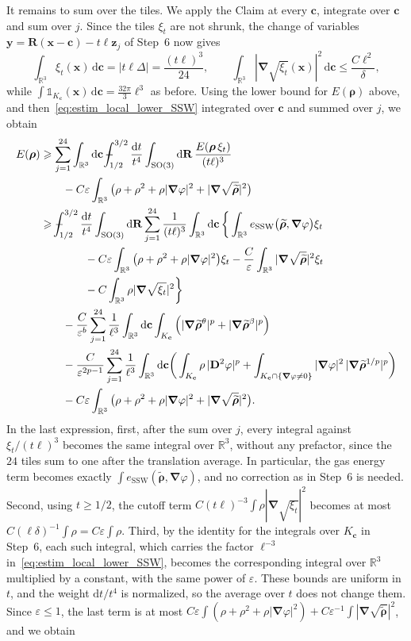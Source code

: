 \documentclass[final,reqno]{amsart}
\theoremstyle{remark}
\renewcommand{\le}{\leqslant}
\renewcommand{\ge}{\geqslant}
\renewcommand{\epsilon}{\varepsilon}
\newcommand{\wt}[1]{\widetilde{#1}}
\newcommand{\RR}{\mathbb{R}}
\newcommand{\SO}{\mathrm{SO}}
\newcommand{\SSW}{\mathrm{SSW}}
\newcommand{\iden}{\mathbb{1}}
\newcommand{\grad}{\bm{\nabla}}
\newcommand{\tetra}{\mathbb{\Delta}}
\newcommand{\dd}{\mathrm{d}}
\def\Xint#1{\mathchoice
{\XXint\displaystyle\textstyle{#1}}
{\XXint\textstyle\scriptstyle{#1}}
{\XXint\scriptstyle\scriptscriptstyle{#1}}
{\XXint\scriptscriptstyle\scriptscriptstyle{#1}}
\!\int}
\def\XXint#1#2#3{{\setbox0=\hbox{$#1{#2#3}{\int}$ }
\vcenter{\hbox{$#2#3$ }}\kern-.6\wd0}}
\def\dashint{\Xint-}
\begin{document}
It remains to sum over the tiles. We apply the Claim at every $\mathbf{c}$, integrate over $\mathbf{c}$ and sum over $j$. Since the tiles $\xi_t$ are not shrunk, the change of variables $\mathbf{y}=\mathbf{R}(\mathbf{x}-\mathbf{c})-t\ell\mathbf{z}_j$ of Step~6 now gives
$$
\int_{\RR^3}\xi_t(\mathbf{x})\,\dd\mathbf{c}=|t\ell\tetra|=\frac{(t\ell)^3}{24},\qquad
\int_{\RR^3}|\grad\sqrt{\xi_t}(\mathbf{x})|^2\,\dd\mathbf{c}\le\frac{C\ell^2}{\delta},
$$
while $\int\iden_{K_{\mathbf{c}}}(\mathbf{x})\,\dd\mathbf{c}=\frac{32\pi}{3}\ell^3$ as before. Using the lower bound for $E(\bm{\rho})$ above, and then~\cref{eq:estim_local_lower_SSW} integrated over $\mathbf{c}$ and summed over $j$, we obtain
\begin{align*}
E(\bm{\rho})&\ge\sum_{j=1}^{24}\int_{\RR^3}\dd\mathbf{c}\,\dashint_{1/2}^{3/2}\frac{\dd t}{t^4}\int_{\SO(3)}\dd\mathbf{R}\,\frac{E(\bm{\rho}\,\xi_t)}{(t\ell)^3}\\
&\qquad-C\epsilon\int_{\RR^3}\big(\rho+\rho^2+\rho|\grad\varphi|^2+|\grad\sqrt{\wt{\bm{\rho}}}|^2\big)\\
&\ge\dashint_{1/2}^{3/2}\frac{\dd t}{t^4}\int_{\SO(3)}\dd\mathbf{R}\sum_{j=1}^{24}\frac{1}{(t\ell)^3}\int_{\RR^3}\dd\mathbf{c}\,\bigg\{\int_{\RR^3}e_\SSW\big(\wt{\bm{\rho}},\grad\varphi\big)\xi_t\\
&\qquad\qquad-C\epsilon\int_{\RR^3}\big(\rho+\rho^2+\rho|\grad\varphi|^2\big)\xi_t-\frac C\epsilon\int_{\RR^3}|\grad\sqrt{\wt{\bm{\rho}}}|^2\xi_t\\
&\qquad\qquad-C\int_{\RR^3}\rho|\grad\sqrt{\xi_t}|^2\bigg\}\\
&\qquad-\frac{C}{\epsilon^b}\sum_{j=1}^{24}\frac{1}{\ell^3}\int_{\RR^3}\dd\mathbf{c}\int_{K_{\mathbf{c}}}\Big(|\grad\wt{\bm{\rho}}^\theta|^p+|\grad\wt{\bm{\rho}}^\beta|^p\Big)\\
&\qquad-\frac{C}{\epsilon^{2p-1}}\sum_{j=1}^{24}\frac{1}{\ell^3}\int_{\RR^3}\dd\mathbf{c}\bigg(\int_{K_{\mathbf{c}}}\rho\,|\mathbf{D}^2\varphi|^p+\int_{K_{\mathbf{c}}\cap\{\grad\varphi\ne0\}}|\grad\varphi|^2\,|\grad\wt{\bm{\rho}}^{1/p}|^p\bigg)\\
&\qquad-C\epsilon\int_{\RR^3}\big(\rho+\rho^2+\rho|\grad\varphi|^2+|\grad\sqrt{\wt{\bm{\rho}}}|^2\big).
\end{align*}
In the last expression, first, after the sum over $j$, every integral against $\xi_t/(t\ell)^3$ becomes the same integral over $\RR^3$, without any prefactor, since the $24$ tiles sum to one after the translation average. In particular, the gas energy term becomes exactly $\int e_\SSW(\wt{\bm{\rho}},\grad\varphi)$, and no correction as in Step~6 is needed. Second, using $t\ge1/2$, the cutoff term $C(t\ell)^{-3}\int\rho|\grad\sqrt{\xi_t}|^2$ becomes at most $C(\ell\delta)^{-1}\int\rho=C\epsilon\int\rho$. Third, by the identity for the integrals over $K_{\mathbf{c}}$ in Step~6, each such integral, which carries the factor $\ell^{-3}$ in~\cref{eq:estim_local_lower_SSW}, becomes the corresponding integral over $\RR^3$ multiplied by a constant, with the same power of $\epsilon$. These bounds are uniform in $t$, and the weight $\dd t/t^4$ is normalized, so the average over $t$ does not change them. Since $\epsilon\le1$, the last term is at most $C\epsilon\int(\rho+\rho^2+\rho|\grad\varphi|^2)+C\epsilon^{-1}\int|\grad\sqrt{\wt{\bm{\rho}}}|^2$, and we obtain
\end{document}
